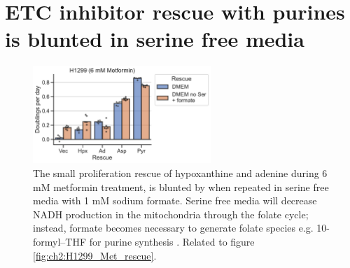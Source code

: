 \section{ETC inhibitor rescue with purines is blunted in serine free media}
\begin{figure}[ht]
    \centering
    \includegraphics[width=0.6\textwidth]{figures/chap2/app/H1299_Met_rescue_noSer.pdf}
    \caption[ETC inhibitor purine rescue in serine free media.]{
    The small proliferation rescue of hypoxanthine and adenine during 6 mM metformin treatment, is blunted by when repeated in serine free media with 1 mM sodium formate.
    Serine free media will decrease NADH production in the mitochondria through the folate cycle; instead, formate becomes necessary to generate folate species e.g. 10-formyl–THF for purine synthesis \cite{Ducker2016-mz, Ducker2017-mb, Yang2020-fs}.
    Related to figure \ref{fig:ch2:H1299_Met_rescue}.
    }
    \label{fig:app_ch2:H1299_Met_rescue_noSer}
\end{figure}





